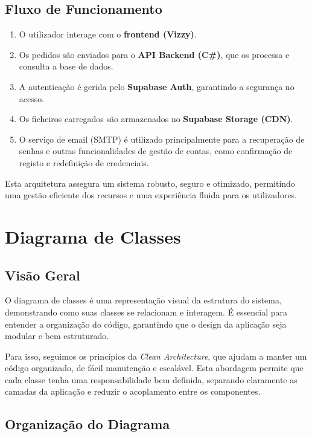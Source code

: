 \documentclass[a4paper, 12pt]{article} %
\begin{document}
\subsection{Fluxo de Funcionamento}
\begin{enumerate}
	\item O utilizador interage com o \textbf{frontend (Vizzy)}.
	\item Os pedidos são enviados para o \textbf{API Backend (C\#)}, que os processa e consulta a base de dados.
	\item A autenticação é gerida pelo \textbf{Supabase Auth}, garantindo a segurança no acesso.
	\item Os ficheiros carregados são armazenados no \textbf{Supabase Storage (CDN)}.
	\item O serviço de email (SMTP) é utilizado principalmente para a recuperação de senhas e outras funcionalidades de gestão de contas, como confirmação de registo e redefinição de credenciais.
\end{enumerate}

Esta arquitetura assegura um sistema robusto, seguro e otimizado, permitindo uma gestão eficiente dos recursos e uma experiência fluida para os utilizadores.


\newpage
\section{Diagrama de Classes}

\subsection{Visão Geral}  

O diagrama de classes é uma representação visual da estrutura do sistema, demonstrando como suas classes se relacionam e interagem. É essencial para entender a organização do código, garantindo que o design da aplicação seja modular e bem estruturado.

Para isso, seguimos os princípios da \textit{Clean Architecture}, que ajudam a manter um código organizado, de fácil manutenção e escalável. Esta abordagem permite que cada classe tenha uma responsabilidade bem definida, separando claramente as camadas da aplicação e reduzir o acoplamento entre os componentes.

\subsection{Organização do Diagrama}  
\end{document}
